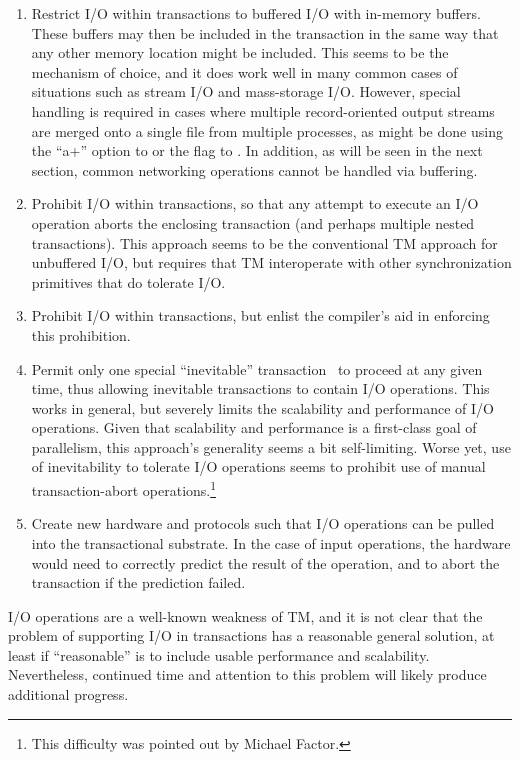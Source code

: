 \begin{enumerate}
\item	Restrict I/O within transactions to buffered I/O with in-memory
	buffers.
	These buffers may then be included in the transaction in the
	same way that any other memory location might be included.
	This seems to be the mechanism of choice, and it does work
	well in many common cases of situations such as stream I/O and
	mass-storage I/O.
	However, special handling is required in cases where multiple
	record-oriented output streams are merged onto a single file
	from multiple processes, as might be done using the ``a+''
	option to  or the   flag to .
	In addition, as will be seen in the next section, common
	networking operations cannot be handled via buffering.
\item	Prohibit I/O within transactions, so that any attempt to execute
	an I/O operation aborts the enclosing transaction (and perhaps
	multiple nested transactions).
	This approach seems to be the conventional TM approach for
	unbuffered I/O, but requires that TM interoperate with other
	synchronization primitives that do tolerate I/O.
\item	Prohibit I/O within transactions, but enlist the compiler's aid
	in enforcing this prohibition.
\item	Permit only one special
	``inevitable'' transaction~\cite{SpearMichaelScott2008InevitableSTM}
	to proceed
	at any given time, thus allowing inevitable transactions to
	contain I/O operations.
	This works in general, but severely limits the scalability and
	performance of I/O operations.
	Given that scalability and performance is a first-class goal of
	parallelism, this approach's generality seems a bit self-limiting.
	Worse yet, use of inevitability to tolerate I/O operations
	seems to prohibit use of manual transaction-abort operations.\footnote{
		This difficulty was pointed out by Michael Factor.}
\item	Create new hardware and protocols such that I/O operations can
	be pulled into the transactional substrate.
	In the case of input operations, the hardware would need to
	correctly predict the result of the operation, and to abort the
	transaction if the prediction failed.
\end{enumerate}

I/O operations are a well-known weakness of TM, and it is not clear
that the problem of supporting I/O in transactions has a reasonable
general solution, at least if ``reasonable'' is to include usable
performance and scalability.
Nevertheless, continued time and attention to this problem will likely
produce additional progress.

